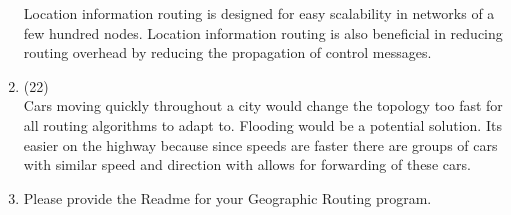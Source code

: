 \documentclass[11pt]{article}
\begin{document}
\begin{enumerate}[label=(\alph*)]
	 Location information routing is designed for easy scalability in networks of a few
	 hundred nodes.  Location information routing is also beneficial in reducing 
	 routing overhead by reducing the propagation of control messages. 
\item (22) \\

	 Cars moving quickly throughout a city would change the topology too fast for all
	 routing algorithms to adapt to. Flooding would be a potential solution. Its easier on
	 the highway because since speeds are faster there are groups of cars with similar 
	 speed and direction with allows for forwarding of these cars.
	 
\item Please provide the Readme for your Geographic Routing program.
\end{enumerate}
 
\end{document}
